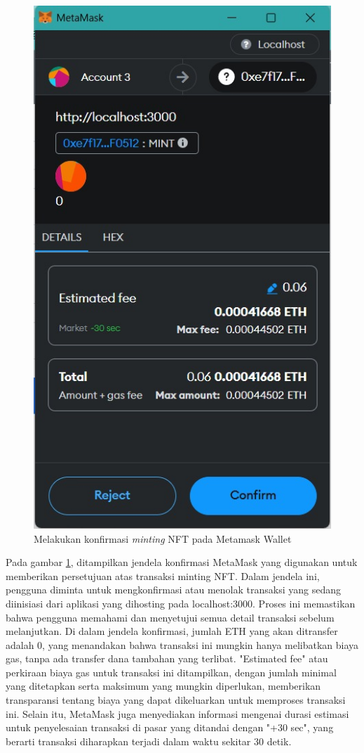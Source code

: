     \begin{figure} [H] \centering
      \includegraphics[scale=0.43]{gambar/confirm_create.jpg}
      \caption{Melakukan konfirmasi \emph{minting} NFT pada Metamask Wallet}
      \label{fig:makenft}
      \end{figure}
  
  
  Pada gambar \ref{fig:makenft}, ditampilkan jendela konfirmasi MetaMask yang digunakan untuk memberikan persetujuan atas transaksi minting NFT. Dalam jendela ini, pengguna diminta untuk mengkonfirmasi atau menolak transaksi yang sedang diinisiasi dari aplikasi yang dihosting pada localhost:3000. Proses ini memastikan bahwa pengguna memahami dan menyetujui semua detail transaksi sebelum melanjutkan. Di dalam jendela konfirmasi, jumlah ETH yang akan ditransfer adalah 0, yang menandakan bahwa transaksi ini mungkin hanya melibatkan biaya gas, tanpa ada transfer dana tambahan yang terlibat. "Estimated fee" atau perkiraan biaya gas untuk transaksi ini ditampilkan, dengan jumlah minimal yang ditetapkan serta maksimum yang mungkin diperlukan, memberikan transparansi tentang biaya yang dapat dikeluarkan untuk memproses transaksi ini. Selain itu, MetaMask juga menyediakan informasi mengenai durasi estimasi untuk penyelesaian transaksi di pasar yang ditandai dengan "+30 sec", yang berarti transaksi diharapkan terjadi dalam waktu sekitar 30 detik.

